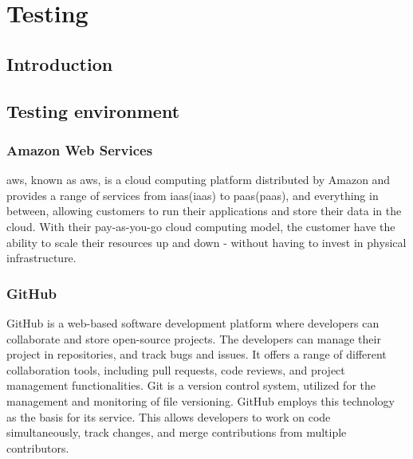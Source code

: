\chapter{Testing}
\section{Introduction}
\section{Testing environment}

\subsection{Amazon Web Services}
\acrlong{aws}, known as \acrshort{aws}, is a cloud computing platform distributed by Amazon and provides a range of services from \acrlong{iaas}(\acrshort{iaas}) to \acrlong{paas}(\acrshort{paas}), and everything in between, allowing customers to run their applications and store their data in the cloud. With their pay-as-you-go cloud computing model, the customer have the ability to scale their resources up and down - without having to invest in physical infrastructure.\cite{aws}  

\subsection{GitHub}
GitHub is a web-based software development platform where developers can collaborate and store open-source projects. The developers can manage their project in repositories, and track bugs and issues. It offers a range of different collaboration tools, including pull requests, code reviews, and project management functionalities. Git is a version control system, utilized for the management and monitoring of file versioning. GitHub employs this technology as the basis for its service. This allows developers to work on code simultaneously, track changes, and merge contributions from multiple contributors.\cite{github}
